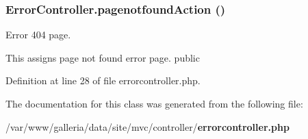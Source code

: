 \subsubsection{\setlength{\rightskip}{0pt plus 5cm}ErrorController.pagenotfoundAction ()}\label{classErrorController_eea85b54c9f6fa53a7eab8cbbde7d5ca}


Error 404 page.

This assigns page not found error page.  public 

Definition at line 28 of file errorcontroller.php.

The documentation for this class was generated from the following file:\begin{CompactItemize}
\item 
/var/www/galleria/data/site/mvc/controller/{\bf errorcontroller.php}\end{CompactItemize}

